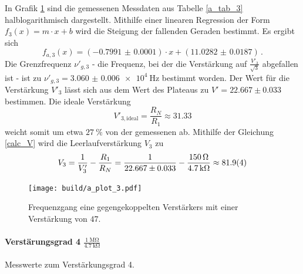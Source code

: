 In Grafik \ref{fig:a_plot_3} sind die gemessenen Messdaten aus Tabelle \ref{a_tab_3} halblogarithmisch dargestellt.
Mithilfe einer linearen Regression der Form $f_3(x)= m \cdot x + b$ wird die Steigung der fallenden Geraden bestimmt.
Es ergibt sich
\begin{equation*}
    f_{a,3}(x) = (\num{-0.7991(1)}) \cdot x + (\num{11.0282(187)})\,.
\end{equation*}
Die Grenzfrequenz $\nu'_{g,3}$ - die Frequenz, bei der die Verstärkung auf $\frac{V'_3}{\sqrt{3}}$ abgefallen ist - ist zu $\nu'_{g,3} = \SI{3.060(6)e4}{\hertz}$ bestimmt worden.
Der Wert für die Verstärkung $V'_3$ lässt sich aus dem Wert des Plateaus zu $V'=22.667\pm0.033$ bestimmen.
Die ideale Verstärkung 
\begin{equation*}
    V'_{3,\text{ideal}} = \frac{R_N}{R_1} \approx 31.33
\end{equation*}
weicht somit um etwa $\SI{27}{\percent}$ von der gemessenen ab.
Mithilfe der Gleichung \eqref{calc_V} wird die Leerlaufverstärkung $V_3$ zu
\begin{equation*}
    V_3 = \frac{1}{V'_3} - \frac{R_1}{R_N} = \frac{1}{22.667\pm0.033} - \frac{\SI{150}{\ohm}}{\SI{4.7}{\kilo\ohm}} \approx \num{81.9\pm0.4}
\end{equation*}

\begin{figure}[h!]
    \centering
    \texttt{[image: build/a\_plot\_3.pdf]}
    \caption{Frequenzgang eine gegengekoppelten Verstärkers mit einer Verstärkung von $47$.}
    \label{fig:a_plot_3}
\end{figure}

\paragraph{Verstärungsgrad 4 $\frac{\SI{1}{\mega\ohm}}{\SI{4.7}{\kilo\ohm}}$}

\begin{table}
\centering
\caption{Messwerte zum Verstärkungsgrad 4.}
    \label{tab:a_messwerte_4}
    
\end{table}

